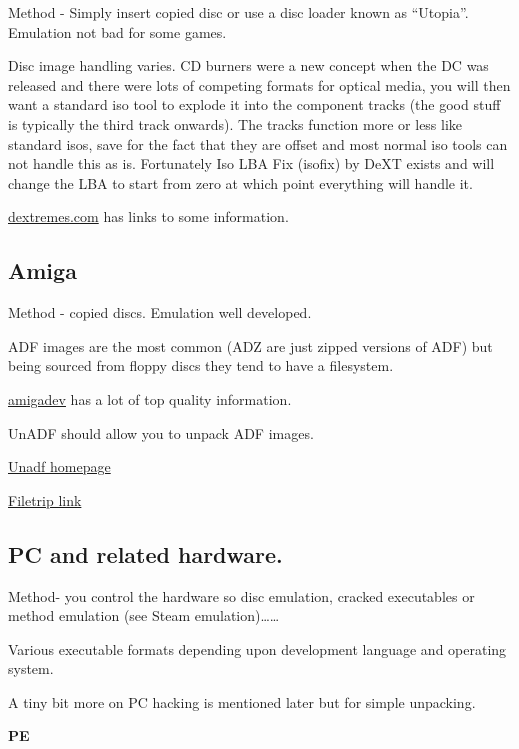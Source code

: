 \documentclass[
]{book}
\begin{document}
Method - Simply insert copied disc or use a disc loader known as ``Utopia''. Emulation not bad for some games.

Disc image handling varies. CD burners were a new concept when the DC was released and there were lots of competing formats for optical media, you will then want a standard iso tool to explode it into the component tracks (the good stuff is typically the third track onwards). The tracks function more or less like standard isos, save for the fact that they are offset and most normal iso tools can not handle this as is. Fortunately Iso LBA Fix (isofix) by DeXT exists and will change the LBA to start from zero at which point everything will handle it.

\href{http://dextremes.com/dc/data/index.html}{dextremes.com} has links to some information.

\hypertarget{amiga}{%
\subsection{Amiga}\label{amiga}}

Method - copied discs. Emulation well developed.

ADF images are the most common (ADZ are just zipped versions of ADF) but being sourced from floppy discs they tend to have a filesystem.

\href{http://amigadev.elowar.com/}{amigadev} has a lot of top quality information.

UnADF should allow you to unpack ADF images.

\href{http://lclevy.free.fr/adflib/unadf.html}{Unadf homepage}

\href{http://filetrip.net/pc-downloads/applications/download-unadf-10-f25764.html}{Filetrip link}

\hypertarget{pc-and-related-hardware.}{%
\subsection{PC and related hardware.}\label{pc-and-related-hardware.}}

Method- you control the hardware so disc emulation, cracked executables or method emulation (see Steam emulation)\ldots\ldots{}

Various executable formats depending upon development language and operating system.

A tiny bit more on PC hacking is mentioned later but for simple unpacking.

\textbf{PE}
\end{document}
